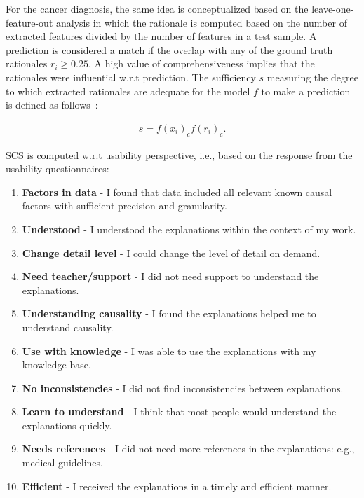 \hspace*{3.5mm} For the cancer diagnosis, the same idea is conceptualized based on the leave-one-feature-out analysis in which the rationale is computed based on the number of extracted features divided by the number of features in a test sample. A prediction is considered a match if the overlap with any of the ground truth rationales $r_i \geq 0.25$. A high value of comprehensiveness implies that the rationales were influential w.r.t prediction. The sufficiency $s$ measuring the degree to which extracted rationales are adequate for the model $f$ to make a prediction is defined  as follows~\cite{deyoung2019eraser}: 

\begin{align}
    s  =  f\left(x_{i}\right)_{c} f\left(r_{i}\right)_{c}.
\end{align}

\hspace*{3.5mm} SCS is computed w.r.t usability perspective, i.e., based on the response from the usability questionnaires:  

\begin{enumerate}[noitemsep]
    \item \textbf{Factors in data} - I found that data included all relevant known causal factors with sufficient precision and granularity.
    \item \textbf{Understood} - I understood the explanations within the context of my work.
    \item \textbf{Change detail level} - I could change the level of detail on demand.
    \item \textbf{Need teacher/support} - I did not need support to understand the explanations.
    \item \textbf{Understanding causality} - I found the explanations helped me to understand causality.
    \item \textbf{Use with knowledge} - I was able to use the explanations with my knowledge base.
    \item \textbf{No inconsistencies} - I did not find inconsistencies between explanations.
    \item \textbf{Learn to understand} - I think that most people would understand the explanations quickly.
    \item \textbf{Needs references} - I did not need more references in the explanations: e.g., medical guidelines.
    \item \textbf{Efficient} - I received the explanations in a timely and efficient manner.
\end{enumerate}

